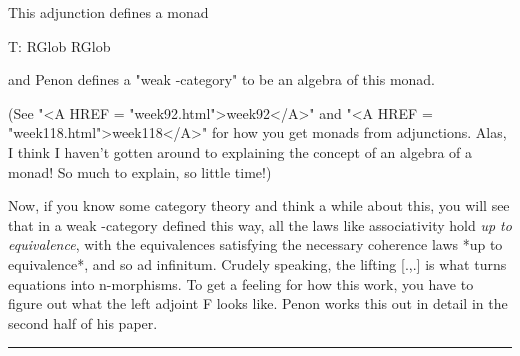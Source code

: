 This adjunction defines a monad

T: RGlob \to  RGlob 

and Penon defines a "weak \omega -category" to be an algebra of this
monad.  

(See "<A HREF = "week92.html">week92</A>" and "<A HREF = "week118.html">week118</A>" for how you get monads from adjunctions.
Alas, I think I haven't gotten around to explaining the concept of an
algebra of a monad!  So much to explain, so little time!)

Now, if you know some category theory and think a while about this,
you will see that in a weak \omega -category defined this way, all
the laws like associativity hold \emph{up to equivalence}, with the
equivalences satisfying the necessary coherence laws *up to 
equivalence*, and so ad infinitum.  Crudely speaking, the 
lifting [.,.] is what turns equations into n-morphisms.  To get
a feeling for how this work, you have to figure out what the left
adjoint F looks like.  Penon works this out in detail in the second
half of his paper.  


 \par\noindent\rule{\textwidth}{0.4pt}

